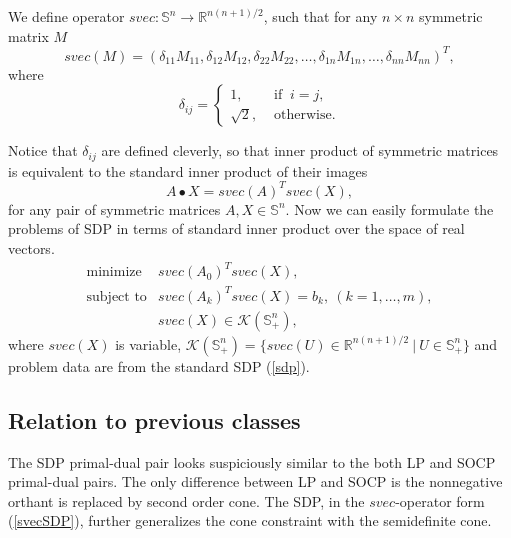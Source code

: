 \documentclass[12pt]{book}
\theoremstyle{definition}
\begin{document}
 \label{svec}
We define operator $svec: \mathbb{S}^n \rightarrow \mathbb{R}^{n(n+1)/2}$, such that for any $n\times n$ symmetric matrix $M$
\begin{equation}
	svec(M) = ( \delta_{11}M_{11},\delta_{12}M_{12},\delta_{22}M_{22},\dots ,\delta_{1n}M_{1n},\dots ,\delta_{nn}M_{nn})^T,
\end{equation}
where
\begin{equation}
	\delta_{ij}= \left\lbrace 
	\begin{array}{ll} 
		1, &\mbox{ if }\ i=j, \\ 
		\sqrt{2}, &\mbox{ otherwise.} 
	\end{array} \right.
\end{equation}

Notice that $\delta_{ij}$ are defined cleverly, so that inner product of symmetric matrices is equivalent to the standard inner product of their images
\begin{equation}
A\bullet X= svec(A)^Tsvec(X), 
\end{equation}
for any pair of symmetric matrices $A,X\in \mathbb{S}^n.$  Now we can easily formulate the problems of SDP in terms of standard inner product over the space of real vectors. 
\begin{equation}
\label{svecSDP}
\begin{array}{ll}
\mbox{minimize} & svec(A_0)^T svec(X),\\
\mbox{subject to}& svec(A_k)^T svec(X)  = b_k, \ (k = 1,\dots ,m), \\
& svec(X) \in \mathcal{K}(\mathbb{S}^n_+),
\end{array}
\end{equation}
where $svec(X)$ is variable,  $\mathcal{K}(\mathbb{S}^n_+) = \{svec(U)\in \mathbb{R}^{n(n+1)/2}\ |\ U\in \mathbb{S}^n_+\}$ 
and problem data are from the standard SDP (\ref{sdp}).


\subsection{Relation to previous classes}
The  SDP primal-dual pair looks suspiciously similar to the both LP and SOCP primal-dual pairs. 
The only difference between LP and SOCP is the nonnegative orthant is replaced by second order cone. 
The SDP, in the $svec$-operator form (\ref{svecSDP}), further generalizes the cone constraint with the semidefinite cone.
\end{document}
